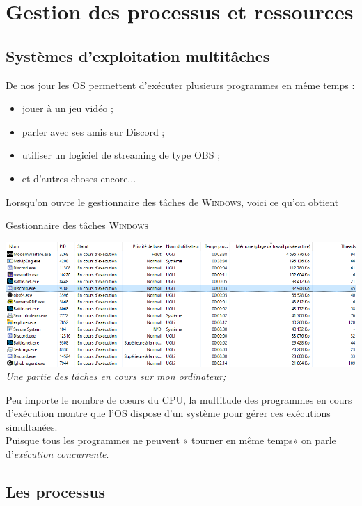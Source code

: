 \documentclass[10pt,firamath,cours]{nsi}
\begin{document}
\setcounter{chapter}{13}


\chapter{Gestion des processus et ressources}


\section{Systèmes d'exploitation multitâches}
De nos jour les OS permettent d'exécuter plusieurs programmes en même temps :\\

\begin{itemize}
	\item jouer à un jeu vidéo ;
    \item parler avec ses amis sur Discord ;
    \item utiliser un logiciel de streaming de type OBS ;
    \item et d'autres choses encore...
\end{itemize}
Lorsqu'on ouvre le gestionnaire des tâches de \textsc{Windows}, voici ce qu'on obtient

{Gestionnaire des tâches \textsc{Windows}}
\begin{center}
\includegraphics[width=\linewidth]{img/gest}\\
\small \textit{Une partie des tâches en cours sur mon ordinateur;}
\end{center}


Peu importe le nombre de c\oe urs du CPU, la multitude des programmes en cours d'exécution montre que l'OS dispose d'un système pour gérer ces exécutions simultanées.\\
Puisque tous les programmes ne peuvent « tourner en même temps» on parle d'\textit{exécution concurrente}.

\section{Les processus}
\end{document}
